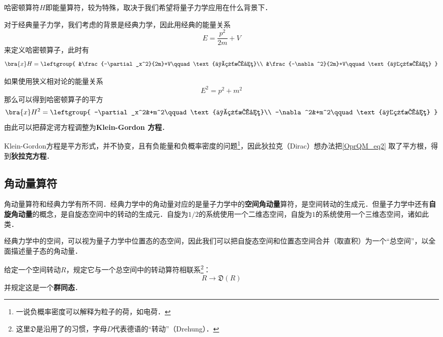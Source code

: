 哈密顿算符$H$即能量算符，较为特殊，取决于我们希望将量子力学应用在什么背景下．

对于经典量子力学，我们考虑的背景是经典力学，因此用经典的能量关系
\begin{equation}
E=\frac{p^2}{2m}+V
\end{equation}
来定义哈密顿算子，此时有
\begin{equation}
\bra{x}H = \leftgroup{
    &\frac{-\partial_x^2}{2m}+V\qquad\text{一维情况}\\
    &\frac{-\nabla^2}{2m}+V\qquad\text{三维情况}
}
\end{equation}

如果使用狭义相对论的能量关系
\begin{equation}
E^2 = p^2+m^2
\end{equation}
那么可以得到哈密顿算子的平方
\begin{equation}\label{OprQM_eq2}
\bra{x}H^2 = \leftgroup{
    -\partial_x^2&+m^2\qquad\text{一维情况}\\
    -\nabla^2&+m^2\qquad\text{三维情况}
}
\end{equation}
由此可以把薛定谔方程调整为\textbf{Klein-Gordon 方程}．

Klein-Gordon方程是平方形式，并不协变，且有负能量和负概率密度的问题\footnote{一说负概率密度可以解释为粒子的荷，如电荷．}，因此狄拉克（Dirac）想办法把\autoref{OprQM_eq2} 取了平方根，得到\textbf{狄拉克方程}．



\subsection{角动量算符}\label{OprQM_sub1}

角动量算符和经典力学有所不同．经典力学中的角动量对应的是量子力学中的\textbf{空间角动量}算符，是空间转动的生成元．但量子力学中还有\textbf{自旋角动量}的概念，是自旋态空间中的转动的生成元．自旋为$1/2$的系统使用一个二维态空间，自旋为$1$的系统使用一个三维态空间，诸如此类．

经典力学中的空间，可以视为量子力学中位置态的态空间，因此我们可以把自旋态空间和位置态空间合并（取直积）为一个“总空间”，以全面描述量子态的角动量．

给定一个空间转动$R$，规定它与一个总空间中的转动算符相联系\footnote{这里$\mathfrak{D}$是沿用了\cite{Sakurai}的习惯，字母$D$代表德语的“转动”（Drehung）．}：
\begin{equation}
R\to \mathfrak{D}(R)
\end{equation}
并规定这是一个\textbf{群同态}．


